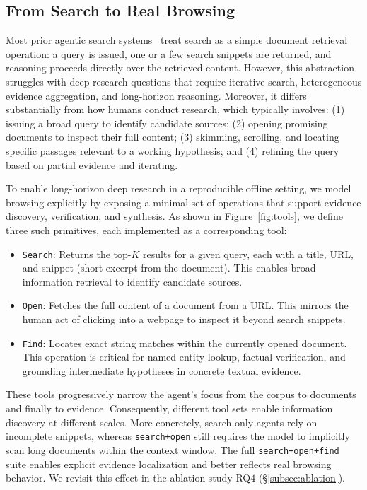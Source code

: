 \subsection{From Search to Real Browsing}
\label{subsec:browser_tools}

Most prior agentic search systems~\citep{jin2025search, jiang2025verltool, li2025agentflow} treat search as a simple document retrieval operation: a query is issued, one or a few search snippets are returned, and reasoning proceeds directly over the retrieved content. However, this abstraction struggles with deep research questions that require iterative search, heterogeneous evidence aggregation, and long-horizon reasoning. Moreover, it differs substantially from how humans conduct research, which typically involves: (1) issuing a broad query to identify candidate sources; (2) opening promising documents to inspect their full content; (3) skimming, scrolling, and locating specific passages relevant to a working hypothesis; and (4) refining the query based on partial evidence and iterating.

To enable long-horizon deep research in a reproducible offline setting, we model browsing explicitly by exposing a minimal set of operations that support evidence discovery, verification, and synthesis. As shown in Figure~\ref{fig:tools}, we define three such primitives, each implemented as a corresponding tool:

\begin{itemize}[leftmargin=*, label=\textbullet]
    \item \texttt{Search}: Returns the top-$K$ results for a given query, each with a title, URL, and snippet (short excerpt from the document). This enables broad information retrieval to identify candidate sources.
    
    \item \texttt{Open}: Fetches the full content of a document from a URL. This mirrors the human act of clicking into a webpage to inspect it beyond search snippets.
    
    \item \texttt{Find}: Locates exact string matches within the currently opened document. This operation is critical for named-entity lookup, factual verification, and grounding intermediate hypotheses in concrete textual evidence.
\end{itemize}


These tools progressively narrow the agent’s focus from the corpus to documents and finally to evidence. Consequently, different tool sets enable information discovery at different scales. More concretely, search-only agents rely on incomplete snippets, whereas \texttt{search+open} still requires the model to implicitly scan long documents within the context window. The full \texttt{search+open+find} suite enables explicit evidence localization and better reflects real browsing behavior. We revisit this effect in the ablation study RQ$4$ (\S\ref{subsec:ablation}).


